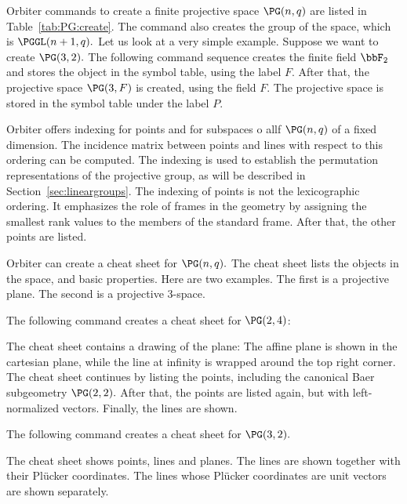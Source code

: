 Orbiter commands to create a finite projective space $\PG(n,q)$ 
are listed in Table~\ref{tab:PG:create}.
The command also creates the group of the space, 
which is $\PGGL(n+1,q).$
Let us look at a very simple example. 
Suppose we want to create $\PG(3,2).$ 
The following command sequence creates the finite field $\bbF_2$ 
and stores the object in the symbol table, using the label $F$.
After that, the projective space $\PG(3,F)$ is created, using the field $F$. 
The projective space is 
stored in the symbol table under the label $P$.



\bigskip





Orbiter offers 
indexing for points and for subspaces o allf $\PG(n,q)$ of a fixed dimension. 
The incidence matrix between points and lines with respect to this ordering can be 
computed. 
The indexing is used to establish 
the permutation representations of the projective group, 
as will be described in Section~\ref{sec:lineargroups}.
The indexing of points is not the lexicographic ordering. 
It emphasizes the role of frames in the geometry
by assigning the smallest rank values to the members of the standard frame. 
After that, the other points are listed. 

\bigskip


Orbiter can create a cheat sheet for $\PG(n,q).$ 
The cheat sheet lists the objects in the space, and basic properties.
Here are two examples. 
The first is a projective plane. The second is a projective 3-space. 

\bigskip


The following command creates a cheat sheet 
for $\PG(2,4)$:


The cheat sheet contains a drawing of the plane:
The affine plane is shown in the cartesian plane, 
while the line at infinity 
is wrapped around the top right corner.
The cheat sheet continues by listing the points, including the 
canonical Baer subgeometry $\PG(2,2).$
After that, the points are listed again, 
but with left-normalized vectors.
Finally, the lines are shown. 



\bigskip

The following command creates a cheat sheet for $\PG(3,2).$


The cheat sheet shows points, lines and planes. 
The lines are shown together with their Pl\"ucker coordinates. 
The lines whose Pl\"ucker coordinates are unit vectors are shown separately.

\bigskip

